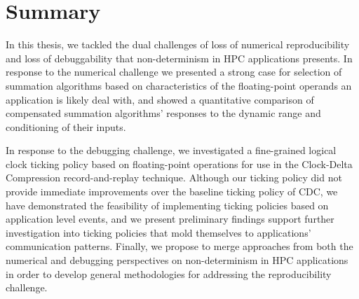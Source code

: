 \section{Summary}

In this thesis, we tackled the dual challenges of loss of numerical
reproducibility and loss of debuggability that non-determinism in HPC
applications presents. In response to the numerical challenge we
presented a strong case for selection of summation algorithms based on
characteristics of the floating-point operands an application is
likely deal with, and showed a quantitative comparison of compensated
summation algorithms' responses to the dynamic range and conditioning
of their inputs. 

In response to the debugging challenge, we investigated a fine-grained
logical clock ticking policy based on floating-point operations for
use in the Clock-Delta Compression record-and-replay
technique. Although our ticking policy did not provide immediate
improvements over the baseline ticking policy of CDC, we have
demonstrated the feasibility of implementing ticking policies based on
application level events, and we present preliminary findings support
further investigation into ticking policies that mold themselves to
applications' communication patterns. Finally, we propose to merge
approaches from both the numerical and debugging perspectives on
non-determinism in HPC applications in order to develop general
methodologies for addressing the reproducibility challenge.

